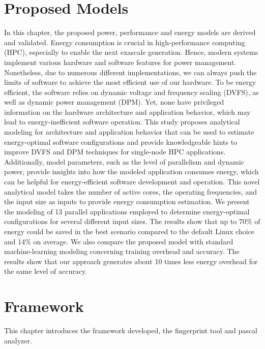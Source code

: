 \documentclass[
papersize=a4,
pagelayout=default,
fontname=latinmodern,
fontsize=11pt,
twoside,
final,
faculty=fpms,
]{umons-Thesis}
\begin{document}
	\chapter{Proposed Models} \label{chapter:models}
	In this chapter, the proposed power, performance and energy models are derived and validated.
	Energy consumption is crucial in high-performance computing (HPC), especially to enable the next exascale generation. Hence, modern systems implement various hardware and software features for power management. Nonetheless, due to numerous different implementations, we can always push the limits of software to achieve the most efficient use of our hardware. To be
	energy efficient, the software relies on dynamic voltage and frequency scaling (DVFS), as well as dynamic power management (DPM). Yet, none have privileged information on the hardware architecture and application behavior, which may lead to energy-inefficient software operation. 
	This study  proposes analytical modeling for architecture and application behavior that can be used to estimate energy-optimal software configurations and provide knowledgeable hints to improve DVFS and DPM techniques for single-node HPC applications.
	Additionally, model parameters, such as the level of parallelism and dynamic power, provide insights into how the modeled application consumes energy, which can be helpful for energy-efficient software development and operation.
	This novel analytical model takes the number of active cores, the operating frequencies, and the input size as inputs to provide energy consumption estimation.
	We present the modeling of 13 parallel applications employed to determine energy-optimal configurations for several different input sizes.
	The results show that up to 70\% of energy could be saved in the best scenario compared to the default Linux choice and 14\% on average.
	We also compare the proposed model with standard machine-learning modeling concerning training overhead and accuracy. The results show that our approach generates about 10 times less energy overhead for the same level of accuracy.
	
	
	
	\chapter{Framework}
	This chapter introduces the framework developed, the fingerprint tool and pascal analyzer.
	
	
	
	
\end{document}
